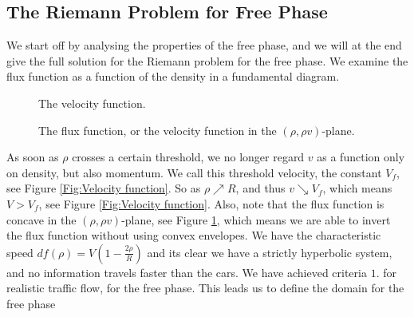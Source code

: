 \documentclass{article}
\numberwithin{equation}{section}
\begin{document}
\subsection{The Riemann Problem for Free Phase}\label{RPFreePh}
We start off by analysing the properties of the free phase, and we will at the end give the full solution for the Riemann problem for the free phase. We examine the flux function as a function of the density in a fundamental diagram. 
\begin{figure} \centering 
\begin{minipage}{.35\textwidth}
\caption{The velocity function.}
\label{Fig:Velocity function}
\end{minipage}
\begin{minipage}{.35\textwidth}
\caption{The flux function, or the velocity function in the $(\rho, \rho v)$-plane.}
\label{Fig:Flux function}
\end{minipage}
\end{figure}

As soon as $\rho$ crosses a certain threshold, we no longer regard $v$ as a function only on density, but also momentum. We call this threshold velocity, the constant $V_f$, see Figure \ref{Fig:Velocity function}. So as $\rho \nearrow R$, and thus $v \searrow V_f$, which means $V > V_f $, see Figure \ref{Fig:Velocity function}. Also, note that the flux function is concave in the $(\rho, \rho v)$-plane, see Figure \ref{Fig:Flux function}, which means we are able to invert the flux function without using convex envelopes. We have the characteristic speed $df(\rho) = V(1- \frac{2\rho}{R})$ and its clear we have a strictly hyperbolic system, and no information travels faster than the cars. We have achieved criteria $1.$ for realistic traffic flow, for the free phase. This leads us to define the domain for the free phase
\end{document}
